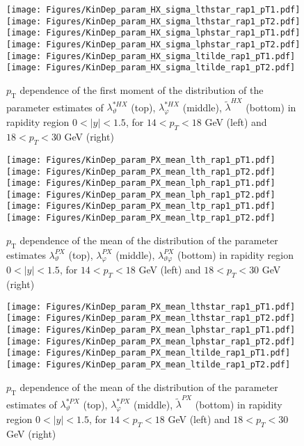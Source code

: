 \documentclass[12pt]{article}
\newcommand{\pT}{p_\mathrm{T}}
\newcommand{\absy}{\left |  y \right |}
\newcommand{\lamtildeHX}{\tilde{\lambda}^{\scriptscriptstyle HX}}
\newcommand{\lamthstarHX}{\lambda^{* \scriptscriptstyle HX}_\vartheta}
\newcommand{\lamphstarHX}{\lambda^{* \scriptscriptstyle HX}_\varphi}
\newcommand{\lamthPX}{\lambda^{\scriptscriptstyle PX}_\vartheta}
\newcommand{\lamphPX}{\lambda^{\scriptscriptstyle PX}_\varphi}
\newcommand{\lamthphPX}{\lambda^{\scriptscriptstyle PX}_{\vartheta \varphi}}
\newcommand{\lamtildePX}{\tilde{\lambda}^{\scriptscriptstyle PX}}
\newcommand{\lamthstarPX}{\lambda^{* \scriptscriptstyle PX}_\vartheta}
\newcommand{\lamphstarPX}{\lambda^{* \scriptscriptstyle PX}_\varphi}
\begin{document}
\begin{figure}[htbp]
\centering
\texttt{[image: Figures/KinDep\_param\_HX\_sigma\_lthstar\_rap1\_pT1.pdf]}
\texttt{[image: Figures/KinDep\_param\_HX\_sigma\_lthstar\_rap1\_pT2.pdf]}
\texttt{[image: Figures/KinDep\_param\_HX\_sigma\_lphstar\_rap1\_pT1.pdf]}
\texttt{[image: Figures/KinDep\_param\_HX\_sigma\_lphstar\_rap1\_pT2.pdf]}
\texttt{[image: Figures/KinDep\_param\_HX\_sigma\_ltilde\_rap1\_pT1.pdf]}
\texttt{[image: Figures/KinDep\_param\_HX\_sigma\_ltilde\_rap1\_pT2.pdf]}
\caption{$\pT$ dependence of the first moment of the distribution of the parameter estimates of $\lamthstarHX$ (top), $\lamphstarHX$ (middle), $\lamtildeHX$ (bottom) in rapidity region $0<\absy<1.5$, for $14 < p_T < 18$ GeV (left) and
$18 < p_T < 30$ GeV (right)}
\end{figure}
\clearpage








\begin{figure}[htbp]
\centering
\texttt{[image: Figures/KinDep\_param\_PX\_mean\_lth\_rap1\_pT1.pdf]}
\texttt{[image: Figures/KinDep\_param\_PX\_mean\_lth\_rap1\_pT2.pdf]}
\texttt{[image: Figures/KinDep\_param\_PX\_mean\_lph\_rap1\_pT1.pdf]}
\texttt{[image: Figures/KinDep\_param\_PX\_mean\_lph\_rap1\_pT2.pdf]}
\texttt{[image: Figures/KinDep\_param\_PX\_mean\_ltp\_rap1\_pT1.pdf]}
\texttt{[image: Figures/KinDep\_param\_PX\_mean\_ltp\_rap1\_pT2.pdf]}
\caption{$\pT$ dependence of the mean of the distribution of the parameter estimates $\lamthPX$ (top), $\lamphPX$ (middle), $\lamthphPX$ (bottom) in rapidity region $0<\absy<1.5$, for $14 < p_T < 18$ GeV (left) and
$18 < p_T < 30$ GeV (right)}
\end{figure}
\clearpage

\begin{figure}[htbp]
\centering
\texttt{[image: Figures/KinDep\_param\_PX\_mean\_lthstar\_rap1\_pT1.pdf]}
\texttt{[image: Figures/KinDep\_param\_PX\_mean\_lthstar\_rap1\_pT2.pdf]}
\texttt{[image: Figures/KinDep\_param\_PX\_mean\_lphstar\_rap1\_pT1.pdf]}
\texttt{[image: Figures/KinDep\_param\_PX\_mean\_lphstar\_rap1\_pT2.pdf]}
\texttt{[image: Figures/KinDep\_param\_PX\_mean\_ltilde\_rap1\_pT1.pdf]}
\texttt{[image: Figures/KinDep\_param\_PX\_mean\_ltilde\_rap1\_pT2.pdf]}
\caption{$\pT$ dependence of the mean of the distribution of the parameter estimates of $\lamthstarPX$ (top), $\lamphstarPX$ (middle), $\lamtildePX$ (bottom) in rapidity region $0<\absy<1.5$, for $14 < p_T < 18$ GeV (left) and
$18 < p_T < 30$ GeV (right)}
\end{figure}
\clearpage
\end{document}
